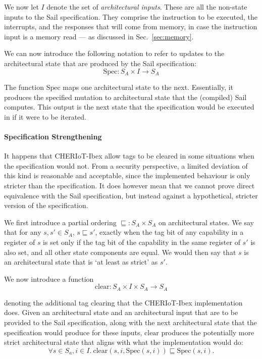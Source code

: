 \documentclass[10pt,conference]{IEEEtran}
\begin{document}
We now let $I$ denote the set of \textit{architectural inputs}. These
are all the non-state inputs to the Sail specification. They comprise the
instruction to be executed, the interrupts, and the responses that will
come from memory, in case the instruction input is a memory read ---
as discussed in Sec.~\ref{sec:memory}.

We can now introduce the following notation to refer to updates to the
architectural state that are produced by the Sail specification:
\[
\mathrm{Spec} : S_A \times I \to S_A
\]

\noindent The function $\mathrm{Spec}$ maps one architectural state to the
next. Essentially, it produces the specified mutation to architectural
state that the (compiled) Sail computes. This output is the next state that
the specification would be executed in if it were to be iterated.


\paragraph{Specification Strengthening}

It happens that CHERIoT-Ibex allow tags to be cleared in
some situations when the specification would not.  From a security
perspective, a limited deviation of this kind is reasonable and acceptable,
since the implemented behaviour is only stricter than the specification.
It does however mean that we cannot prove direct equivalence with the Sail
specification, but instead against a hypothetical,  stricter version of the
specification.

We first introduce a partial ordering $\sqsubseteq : S_A \times S_A$ on
architectural states. We say that for any $s, s' \in S_A$, 
$s \sqsubseteq s'$, exactly when  the tag bit of any capability in
a register of $s$ is set only if the tag bit of the capability in the same
register of $s'$ is also set, and all other state components are equal. We would then
say that $s$ is an architectural state that is `at least as strict' as $s'$.

We now introduce a function
\[
\mathrm{clear} : S_A \times I \times S_A \to S_A
\]

\noindent denoting the additional tag clearing that the CHERIoT-Ibex
implementation does. Given an architectural state and an architectural
input that are to be provided to the Sail specification, along with the next
architectural state that the specification would produce for these inputs,
$\mathrm{clear}$ produces the potentially more strict architectural state
that aligns with what the implementation would do:
\[
\forall s\in S_a, i \in I. \: \mathrm{clear}(s, i, \mathrm{Spec}(s, i)) \sqsubseteq
\mathrm{Spec}(s, i).
\]
\end{document}
